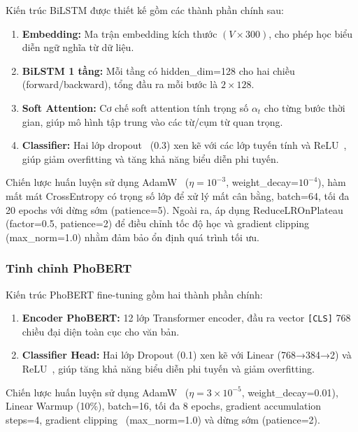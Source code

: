 \documentclass[12pt, a4paper]{report}
\newcommand{\bilstmEmbDim}{300}
\newcommand{\bilstmHiddenDim}{128}
\newcommand{\bilstmLayers}{1}
\begin{document}
Kiến trúc BiLSTM được thiết kế gồm các thành phần chính sau:

\begin{enumerate}[leftmargin=2.5em]
  \item \textbf{Embedding:} Ma trận embedding kích thước $(V \times \bilstmEmbDim)$, cho phép học biểu diễn ngữ nghĩa từ dữ liệu.
  \item \textbf{BiLSTM \bilstmLayers{} tầng:} Mỗi tầng có hidden\_dim=\bilstmHiddenDim{} cho hai chiều (forward/backward), tổng đầu ra mỗi bước là $2\times\bilstmHiddenDim$.
  \item \textbf{Soft Attention:} Cơ chế soft attention tính trọng số $\alpha_t$ cho từng bước thời gian, giúp mô hình tập trung vào các từ/cụm từ quan trọng.
  \item \textbf{Classifier:} Hai lớp dropout~\cite{srivastava2014dropout} (0.3) xen kẽ với các lớp tuyến tính và ReLU~\cite{nair2010relu}, giúp giảm overfitting và tăng khả năng biểu diễn phi tuyến.
\end{enumerate}

Chiến lược huấn luyện sử dụng AdamW~\cite{loshchilov2019adamw}
($\eta = 10^{-3}$, weight\_decay=$10^{-4}$), hàm mất mát CrossEntropy
có trọng số lớp để xử lý mất cân bằng, batch=64, tối đa 20 epochs với
dừng sớm (patience=5). Ngoài ra, áp dụng ReduceLROnPlateau
(factor=0.5, patience=2) để điều chỉnh tốc độ học và gradient clipping~\cite{pascanu2013gradient}
(max\_norm=1.0) nhằm đảm bảo ổn định quá trình tối ưu.

\subsubsection{Tinh chỉnh PhoBERT}

Kiến trúc PhoBERT fine-tuning gồm hai thành phần chính:

\begin{enumerate}[leftmargin=2.5em]
  \item \textbf{Encoder PhoBERT:} 12 lớp Transformer encoder, đầu ra vector \texttt{[CLS]} 768 chiều đại diện toàn cục cho văn bản.
  \item \textbf{Classifier Head:} Hai lớp Dropout (0.1) xen kẽ với Linear (768→384→2) và ReLU~\cite{nair2010relu}, giúp tăng khả năng biểu diễn phi tuyến và giảm overfitting.
\end{enumerate}

Chiến lược huấn luyện sử dụng AdamW~\cite{loshchilov2019adamw}
($\eta = 3 \times 10^{-5}$, weight\_decay=0.01), Linear Warmup (10\%),
batch=16, tối đa 8 epochs, gradient accumulation steps=4, gradient
clipping~\cite{pascanu2013gradient} (max\_norm=1.0) và dừng sớm (patience=2).
\end{document}
